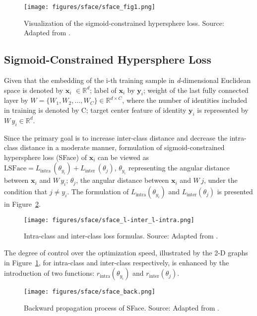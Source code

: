 \documentclass[10pt,a4paper,twoside]{article}
\begin{document}
\begin{figure}[h]
    \centering
    \texttt{[image: figures/sface/sface\_fig1.png]} 
    \caption{Visualization of the sigmoid-constrained hypersphere loss. Source: Adapted from \cite{sface}.}
    \label{fig:sface_f1}
\end{figure}


\subsection{Sigmoid-Constrained Hypersphere Loss}

Given that the embedding of the i-th training sample in \textit{d}-dimensional Euclidean space is denoted by \( \mathbf{x}_i \) \( \in \mathbb{R}^d \); label of \( \mathbf{x}_i \) by \( \mathbf{y}_i \); weight of the last fully connected layer by \( W = \{W_1, W_2, \ldots, W_C\} \in \mathbb{R}^{d \times C} \), where the number of identities included in training is denoted by C; target center feature of identity \( \mathbf{y}_i \) is represented by \( W \, y_i \in \mathbb{R}^d \).

Since the primary goal is to increase inter-class distance and decrease the intra-class distance in a moderate manner, formulation of sigmoid-constrained hypersphere loss (SFace) of \( \mathbf{x}_i \) can be viewed as \( \text{LSFace} = L_{\text{intra}} \, (\theta_{y_i}) + L_{\text{inter}} \, (\theta_j) \), \( \theta_{y_i} \) representing the angular distance between \( \mathbf{x}_i \) and \( W \, y_i \); \( \theta_{j} \), the angular distance between \( \mathbf{x}_i \) and \( W \, j \), under the condition that \( j \neq y_i \). The formulation of \(L_{\text{intra}} (\theta_{y_i}) \) and \( L_{\text{inter}} (\theta_j) \) is presented in Figure~\ref{fig:linterlintra}.

\begin{figure}[h]
    \centering
    \texttt{[image: figures/sface/sface\_l-inter\_l-intra.png]} 
    \caption{Intra-class and inter-class loss formulas. Source: Adapted from \cite{sface}.}
    \label{fig:linterlintra}
\end{figure}

The degree of control over the optimization speed, illustrated by the 2-D graphs in Figure~\ref{fig:sface_f1}, for intra-class and inter-class respectively, is enhanced by the introduction of two functions: \( r_{\text{intra}} (\theta_{y_i}) \) and \( r_{\text{inter}} (\theta_j) \). 

\begin{figure}[h]
    \centering
    \texttt{[image: figures/sface/sface\_back.png]} 
    \caption{Backward propagation process of SFace. Source: Adapted from \cite{sface}.}
    \label{fig:sface_back}
\end{figure}
\end{document}

